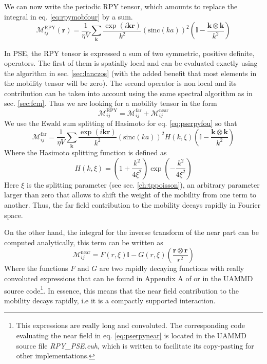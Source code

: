 \documentclass[ twoside,openright,titlepage,numbers=noenddot,%
headinclude,footinclude,cleardoublepage=empty,abstract=on,
BCOR=5mm,paper=a4,fontsize=11pt, dvipsnames
]{scrreprt}
\renewcommand{\vec}[1]{\bm{#1}}
\newcommand{\tens}[1]{\bm{\mathcal{#1}}}
\newcommand{\uammd}{\gls{UAMMD}\xspace}
\newcommand{\sinc}{\textrm{sinc}}
\newcommand{\near}{\textrm{near}}
\newcommand{\far}{\textrm{far}}
\begin{document}
We can now write the periodic \gls{RPY} tensor, which amounts to replace the integral in eq. \eqref{eq:rpymobfour} by a sum.
\begin{equation}
  \label{eq:pserpyfou}
  \tens{M}_{ij}^{\textrm{RPY}}(\vec{r})= \frac{1}{\eta V} \sum_{\vec{k}} \frac{\exp(i\vec{k}\vec{r})}{k^2}\left(\sinc(ka) \right)^2\left(\mathbb{I} - \frac{\vec{k}\otimes\vec{k}}{k^2}\right)
\end{equation}

In \gls{PSE}, the \gls{RPY} tensor is expressed a sum of two symmetric, positive definite, operators. The first of them is spatially local and can be evaluated exactly using the algorithm in sec. \ref{sec:lanczos} (with the added benefit that most elements in the mobility tensor will be zero). The second operator is non local and its contribution can be taken into account using the same spectral algorithm as in sec. \ref{sec:fcm}.
Thus we are looking for a mobility tensor in the form
\begin{equation}
  \label{eq:psemobsep}
  \tens{M}_{ij}^{\textrm{RPY}} = \tens{M}_{ij}^{\far} + \tens{M}^{ \near}_{ij}
\end{equation}
We use the Ewald sum splitting of Hasimoto\cite{Hasimoto1959} for eq. \eqref{eq:pserpyfou} so that
\begin{equation}
  \label{eq:pserpyfar}
  \tens{M}_{ij}^{\far}= \frac{1}{\eta V} \sum_{\vec{k}} \frac{\exp(i\vec{k}\vec{r})}{k^2}\left(\sinc(ka) \right)^2H(k,\xi)\left(\mathbb{I} - \frac{\vec{k}\otimes\vec{k}}{k^2}\right)
\end{equation}
Where the Hasimoto splitting function is defined as
\begin{equation}
  \label{eq:psehasimoto}
  H(k,\xi) = \left(1 + \frac{k^2}{4\xi^2}\right)\exp\left(-\frac{k^2}{4\xi^2}\right)
\end{equation}
Here $\xi$ is the splitting parameter (see sec. \ref{ch:tppoisson}), an arbitrary parameter larger than zero that allows to shift the weight of the mobility from one term to another. Thus, the far field contribution to the mobility decays rapidly in Fourier space.

On the other hand, the integral for the inverse transform of the near part can be computed analytically, this term can be written as
\begin{equation}
  \label{eq:pserpynear}
  \tens{M}_{ij}^{\near}= F(r,\xi)\mathbb I - G(r,\xi)\left(\frac{\vec{r}\otimes\vec{r}}{r^2}\right)
\end{equation}
Where the functions $F$ and $G$ are two rapidly decaying functions with really convoluted expressions that can be found in Appendix A of\cite{Fiore2017} or in the \uammd source code\footnote{This expressions are really long and convoluted. The corresponding code evaluating the near field in eq. \eqref{eq:pserpynear} is located in the \uammd source file \emph{RPY\_PSE.cuh}, which is written to facilitate its copy-pasting for other implementations.}. In essence, this means that the near field contribution to the mobility decays rapidly, i.e it is a compactly supported interaction.
\end{document}
